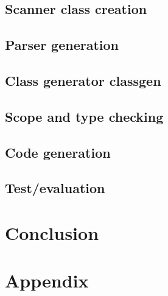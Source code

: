 	\section{Scanner class creation}
	\section{Parser generation}
	\section{Class generator classgen}
	\section{Scope and type checking}
	\section{Code generation}

\renewcommand{\ind}[1]{}
\section{Test/evaluation}

\renewcommand{\ind}[1]{}
\chapter{Conclusion}



\begingroup
	\raggedright
	{}	%
\endgroup


\newpage
\listoffixmes	%

\clearforchapter
\chapter{Appendix}
\appendix	%


\renewcommand{\ind}[1]{}


